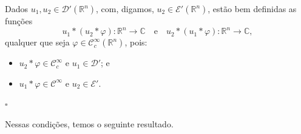 \documentclass[../distribution_theory_notes.tex]{subfiles}
\begin{document}
\begin{def*}
	Dados \(u_{1},u_{2}\in \mathcal{D}'(\mathbb{R}^{n})\), com, digamos, \(u_{2}\in \mathcal{E}'(\mathbb{R}^{n})\), estão bem definidas as funções
	\[
		u_{1}*(u_{2}*\varphi):\mathbb{R}^{n}\longrightarrow \mathbb{C}
		\quad\text{e}\quad
		u_{2}*(u_{1}*\varphi):\mathbb{R}^{n}\longrightarrow \mathbb{C},
	\]
	qualquer que seja \(\varphi\in \mathcal{C}_{c}^{\infty}(\mathbb{R}^{n})\), pois:
	\begin{itemize}
		\item[(a)] \(u_{2}*\varphi\in \mathcal{C}_{c}^{\infty}\) e \(u_{1}\in \mathcal{D}'\); e
		\item[(b)] \(u_{1}*\varphi\in \mathcal{C}^{\infty}\) e \(u_{2}\in \mathcal{E}'\).
	\end{itemize}
	\(\square\)
\end{def*}

Nessas condições, temos o seguinte resultado.
\end{document}
